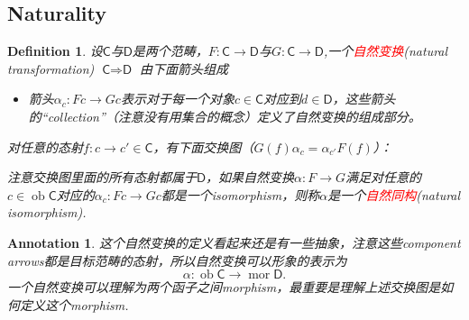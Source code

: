 \documentclass{article}
\newtheorem{definition}[theorem]{Definition}
\newtheorem{annotation}[theorem]{Annotation}
\newcommand*{\cat}[1]{\textsf{#1}\xspace}
\DeclareMathOperator{\ob}{ob}
\DeclareMathOperator{\mor}{mor}
\newcommand{\redt}[1]{\textcolor{red}{#1}}
\begin{document}
\subsection{Naturality}
\begin{definition}
\rm 设$\cat{C}$与$\cat{D}$是两个范畴，$F \colon \cat{C}\rightarrow \cat{D}$与$G \colon \cat{C} \rightarrow \cat{D}$,一个\redt{自然变换}(natural transformation) $\cat{C} \Rightarrow \cat{D}$ 由下面箭头组成
\begin{itemize}
	\item 箭头$\alpha_c \colon Fc \rightarrow Gc$表示对于每一个对象$c \in \cat{C}$对应到$d \in \cat{D}$，这些箭头的“collection”（注意没有用集合的概念）定义了自然变换的组成部分。
\end{itemize}
对任意的态射$f \colon c \rightarrow c' \in \cat{C}$，有下面交换图（$G(f)\alpha_{c}=\alpha_{c'}F(f)$）：
\begin{center}
\end{center}
注意交换图里面的所有态射都属于$\cat{D}$，如果自然变换$\alpha \colon F \rightarrow G$满足对任意的$c \in \ob\cat{C}$对应的$\alpha_{c} : Fc \to Gc$都是一个isomorphism，则称$\alpha$是一个\redt{自然同构}(natural isomorphism). 
\end{definition}

\begin{annotation}
\rm 这个自然变换的定义看起来还是有一些抽象，注意这些component arrows都是目标范畴的态射，所以自然变换可以形象的表示为
$$
\alpha \colon \ob\cat{C} \rightarrow \mor\cat{D}. 
$$
一个自然变换可以理解为两个函子之间morphism，最重要是理解上述交换图是如何定义这个morphism. 
\end{annotation}
\end{document}

